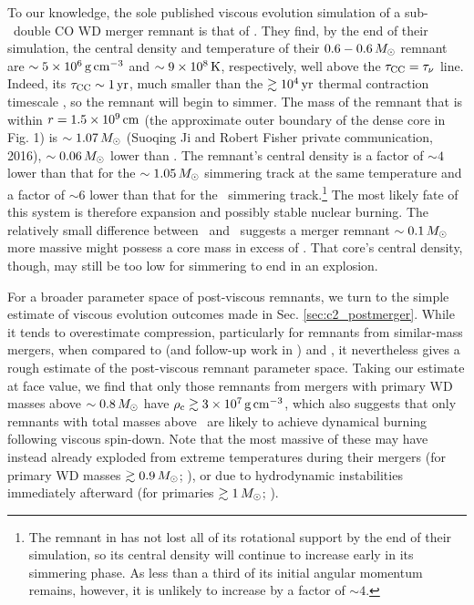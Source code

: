 To our knowledge, the sole published viscous evolution simulation of a sub-\Mch\ double CO WD merger remnant is that of \cite{ji+13}.  They find, by the end of their simulation, the central density and temperature of their $0.6 - 0.6\,\Msun$ remnant are $\sim5\times10^6\,\gcc$ and $\sim9\times10^8\,\mathrm{K}$, respectively, well above the $\taucc = \taunu$ line.  Indeed, its $\taucc \sim 1\,\mrm{yr}$, much smaller than the $\gtrsim 10^4\,\mathrm{yr}$ thermal contraction timescale \citep{shen+12}, so the remnant will begin to simmer.  The mass of the remnant that is within $r = 1.5\times10^9\,\mathrm{cm}$ (the approximate outer boundary of the dense core in \citealt{ji+13} Fig. 1) is $\sim1.07\,\Msun$ (Suoqing Ji and Robert Fisher private communication, 2016), $\sim0.06\,\Msun$ lower than \Mcrit.  The remnant's central density is a factor of $\sim4$ lower than that for the $\sim1.05\,\Msun$ simmering track at the same temperature and a factor of $\sim6$ lower than that for the \Mcrit\ simmering track.\footnote{The remnant in \citep{ji+13} has not lost all of its rotational support by the end of their simulation, so its central density will continue to increase early in its simmering phase.  As less than a third of its initial angular momentum remains, however, it is unlikely to increase by a factor of $\sim4$.}  The most likely fate of this system is therefore expansion and possibly stable nuclear burning.  The relatively small difference between \Mc\ and \Mcrit\ suggests a merger remnant $\sim0.1\,\Msun$ more massive might possess a core mass in excess of \Mcrit.  That core's central density, though, may still be too low for simmering to end in an explosion.



For a broader parameter space of post-viscous remnants, we turn to the simple estimate of viscous evolution outcomes made in Sec. \ref{sec:c2_postmerger}.  While it tends to overestimate compression, particularly for remnants from similar-mass mergers, when compared to \citeauthor{schw+12} (and follow-up work in \citealt{rask+14}) and \cite{ji+13}, it nevertheless gives a rough estimate of the post-viscous remnant parameter space.  Taking our estimate at face value, we find that only those remnants from mergers with primary WD masses above $\sim0.8\,\Msun$ have $\rhoc \gtrsim 3\times10^7\,\gcc$, which also suggests that only remnants with total masses above \Mch\ are likely to achieve dynamical burning following viscous spin-down.  Note that the most massive of these may have instead already exploded from extreme temperatures during their mergers (for primary WD masses $\gtrsim0.9\,\Msun$; \citealt{pakm+10,pakm+11}), or due to hydrodynamic instabilities immediately afterward (for primaries $\gtrsim1\,\Msun$; \citealt{kash+15}).

